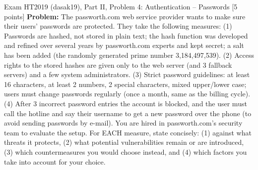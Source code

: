 \documentclass[12pt, a4paper]{article}
\begin{document}
\begin{practicebox}{Exam HT2019 (dasak19), Part II, Problem 4: Authentication -- Passwords [5 points]}
\textbf{Problem:} The passworth.com web service provider wants to make sure their users' passwords are protected. They take the following measures: (1) Passwords are hashed, not stored in plain text; the hash function was developed and refined over several years by passworth.com experts and kept secret; a salt has been added (the randomly generated prime number 3,184,497,539). (2) Access rights to the stored hashes are given only to the web server (and 3 fallback servers) and a few system administrators. (3) Strict password guidelines: at least 16 characters, at least 2 numbers, 2 special characters, mixed upper/lower case; users must change passwords regularly (once a month, same as the billing cycle). (4) After 3 incorrect password entries the account is blocked, and the user must call the hotline and say their username to get a new password over the phone (to avoid sending passwords by e-mail). You are hired in passworth.com's security team to evaluate the setup. For EACH measure, state concisely: (1) against what threats it protects, (2) what potential vulnerabilities remain or are introduced, (3) which countermeasures you would choose instead, and (4) which factors you take into account for your choice.


\end{practicebox}
\end{document}
